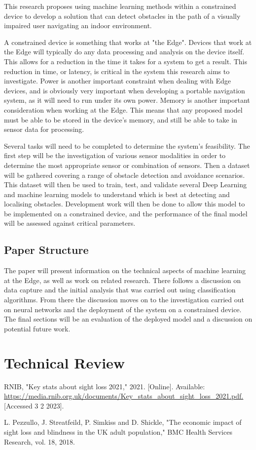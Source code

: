 \documentclass{svproc}
\begin{document}
This research proposes using machine learning methods within a constrained device to develop a solution that can 
detect obstacles in the path of a visually impaired user navigating an indoor environment. 

A constrained device is something that works at "the Edge". Devices that work at the Edge will typically do any 
data processing and analysis on the device itself. This allows for a reduction in the time it takes for a system to get a result. 
This reduction in time, or latency, is critical in the system this research aims to investigate. 
Power is another important constraint when dealing with Edge devices, and is obviously very important when 
developing a portable navigation system, as it will need to run under its own power. 
Memory is another important consideration when working at the Edge. This means that any proposed model 
must be able to be stored in the device's memory, and still be able to take in sensor data for processing. 

Several tasks will need to be completed to determine the system's feasibility. The first step will be the investigation 
of various sensor modalities in order to determine the most appropriate sensor or combination of sensors. 
Then a dataset will be gathered covering a range of obstacle detection and avoidance scenarios. This dataset will then 
be used to train, test, and validate several Deep Learning and machine learning models to understand which is 
best at detecting and localising obstacles. Development work will then be done to allow this model to be implemented on a 
constrained device, and the performance of the final model will be assessed against critical parameters.

\subsection{Paper Structure}
The paper will present information on the technical aspects of machine learning at the Edge, as well as work on related research. 
There follows a discussion on data capture and the initial analysis that was carried out using classification algorithms. From there 
the discussion moves on to the investigation carried out on neural networks and the deployment of the system on a constrained device. 
The final sections will be an evaluation of the deployed model and a discussion on potential future work.

\section{Technical Review}


%
%
\begin{thebibliography}{00}
%
RNIB, "Key stats about sight loss 2021," 2021. [Online]. 
Available: \url{https://media.rnib.org.uk/documents/Key_stats_about_sight_loss_2021.pdf.} [Accessed 3 2 2023].

L. Pezzullo, J. Streatfeild, P. Simkiss and D. Shickle, 
"The economic impact of sight loss and blindness in the UK adult population," BMC Health Services Research, vol. 18, 2018.

\end{thebibliography}
\end{document}
